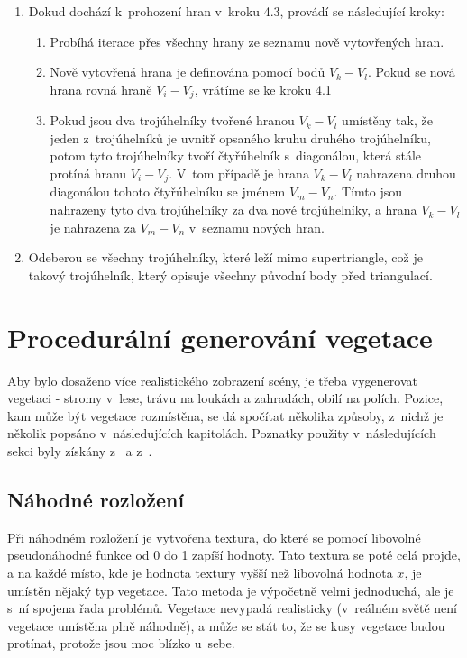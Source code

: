 \begin{enumerate}[label*=\arabic*.]
\begin{enumerate}[label*=\arabic*.]
    \end{enumerate}
    \item Dokud dochází k~prohození hran v~kroku 4.3, provádí se následující kroky:
    \begin{enumerate}[label*=\arabic*.]
        \item Probíhá iterace přes všechny hrany ze seznamu nově vytovřených hran.
        \item Nově vytovřená hrana je definována pomocí bodů $V_k-V_l$. Pokud se nová hrana rovná hraně $V_i-V_j$, vrátíme se ke kroku 4.1
        \item Pokud jsou dva trojúhelníky tvořené hranou $V_k-V_l$ umístěny tak, že jeden z~trojúhelníků je uvnitř opsaného kruhu druhého trojúhelníku, potom tyto trojúhelníky tvoří čtyřúhelník s~diagonálou, která stále protíná hranu $V_i-V_j$. V~tom případě je hrana $V_k-V_l$ nahrazena druhou diagonálou tohoto čtyřúhelníku se jménem $V_m-V_n$. Tímto jsou nahrazeny tyto dva trojúhelníky za dva nové trojúhelníky, a hrana $V_k-V_l$ je nahrazena za $V_m-V_n$ v~seznamu nových hran.
    \end{enumerate}
    \item Odeberou se všechny trojúhelníky, které leží mimo supertriangle, což je takový trojúhelník, který opisuje všechny původní body před triangulací.
\end{enumerate}



\section{Procedurální generování vegetace}
Aby bylo dosaženo více realistického zobrazení scény, je třeba vygenerovat vegetaci - stromy v~lese, trávu na loukách a zahradách, obilí na polích. Pozice, kam může být vegetace rozmístěna, se dá spočítat několika způsoby, z~nichž je několik popsáno v~následujících kapitolách.
Poznatky použity v~následujících sekci byly získány z~\cite{melnychuk_2020} a z~\cite{biagioli_2014}.
\subsection*{Náhodné rozložení}
Při náhodném rozložení je vytvořena textura, do které se pomocí libovolné pseudonáhodné funkce od 0 do 1 zapíší hodnoty. Tato textura se poté celá projde, a na každé místo, kde je hodnota textury vyšší než libovolná hodnota $x$, je umístěn nějaký typ vegetace. Tato metoda je výpočetně velmi jednoduchá, ale je s~ní spojena řada problémů. Vegetace nevypadá realisticky (v~reálném světě není vegetace umístěna plně náhodně), a může se stát to, že se kusy vegetace budou protínat, protože jsou moc blízko u~sebe.

